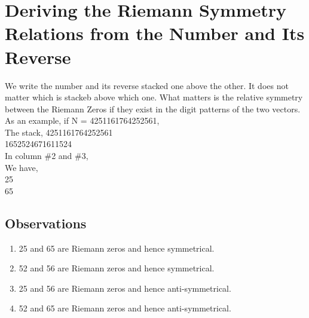 \section{Deriving the Riemann Symmetry Relations from the Number and Its Reverse}
We write the number and its reverse stacked one above the other. It does not matter which is stackeb above which one. What matters is the relative symmetry between the Riemann Zeros if they exist in the digit patterns of the two vectors.\\
As an example, if N = 4251161764252561,\\
The stack,
4251161764252561\\
1652524671611524\\
In column \#2 and \#3,\\ 
We have,\\
25\\
65

\subsection{Observations}
\begin{enumerate}
\item 25 and 65 are Riemann zeros and hence symmetrical.
\item 52 and 56 are Riemann zeros and hence symmetrical. 
\item 25 and 56 are Riemann zeros and hence anti-symmetrical.
\item 52 and 65 are Riemann zeros and hence anti-symmetrical.
\end{enumerate}



